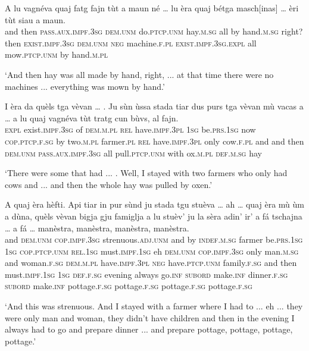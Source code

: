 \begin{linenumbers}
	\gll A lu vagnéva quaj fatg fajn tùt a maun né … lu èra quaj bétga masch[inas] … èri tùt siau a maun.\\
	and then \textsc{pass.aux.impf.3sg} \textsc{dem.unm} do.\textsc{ptcp.unm} hay.\textsc{m.sg} all by hand.\textsc{m.sg} right? {} then \textsc{exist.impf.3sg} \textsc{dem.unm} \textsc{neg} machine.\textsc{f.pl} {} \textsc{exist.impf.3sg.expl} all mow.\textsc{ptcp.unm} by hand.\textsc{m.pl}\\
\end{linenumbers}
\medskip
\glt `And then hay was all made by hand, right, ... at that time there were no machines ... everything was mown by hand.'
\medskip

\begin{linenumbers}
	\gll  I èra da quèls tga vèvan … . Ju sùn ùssa stada tiar dus purs tga vèvan mù vacas a … a lu quaj vagnéva tùt tratg cun bùvs, al fajn.\\
	\textsc{expl} exist.\textsc{impf.3sg} of \textsc{dem.m.pl} \textsc{rel} have.\textsc{impf.3pl} {} {} \textsc{1sg} be.\textsc{prs.1sg} now \textsc{cop.ptcp.f.sg} by two.\textsc{m.pl} farmer.\textsc{pl} \textsc{rel} have.\textsc{impf.3pl} only cow.\textsc{f.pl} and {} and then \textsc{dem.unm} \textsc{pass.aux.impf.3sg} all pull.\textsc{ptcp.unm} with ox.\textsc{m.pl} \textsc{def.m.sg} hay\\
\end{linenumbers}
\medskip
\glt `There were some that had ... . Well, I stayed with two farmers who only had cows and ... and then the whole hay was pulled by oxen.'
\medskip

\begin{linenumbers}
	\gll  A quaj èra hèfti. Api tiar in pur sùnd ju stada tgu stuèva …  ah … quaj èra mù ùm a dùna, quèls vèvan bigja gju famiglja a lu stuèv’ ju la sèra adin’ ir' a fá tschajna … a fá … manèstra, manèstra, manèstra, manèstra.\\
	and \textsc{dem.unm} \textsc{cop.impf.3sg} strenuous.\textsc{adj.unm} and by \textsc{indef.m.sg} farmer be.\textsc{prs.1sg} \textsc{1sg} \textsc{cop.ptcp.unm} \textsc{rel.1sg} must.\textsc{impf.1sg} {} eh {} \textsc{dem.unm} \textsc{cop.impf.3sg} only man.\textsc{m.sg} and woman.\textsc{f.sg} \textsc{dem.m.pl} have.\textsc{impf.3pl} \textsc{neg} have.\textsc{ptcp.unm} family.\textsc{f.sg} and then must.\textsc{impf.1sg} \textsc{1sg} \textsc{def.f.sg} evening always go.\textsc{inf} \textsc{subord} make.\textsc{inf} dinner.\textsc{f.sg} {} \textsc{subord} make.\textsc{inf} {}  pottage.\textsc{f.sg} pottage.\textsc{f.sg} pottage.\textsc{f.sg} pottage.\textsc{f.sg}\\
\end{linenumbers}
\medskip
\glt `And this was strenuous. And I stayed with a farmer where I had to ... eh ... they were only man and woman, they didn't have children and then in the evening I always had to go and prepare dinner ... and prepare pottage, pottage, pottage, pottage.'
\medskip

